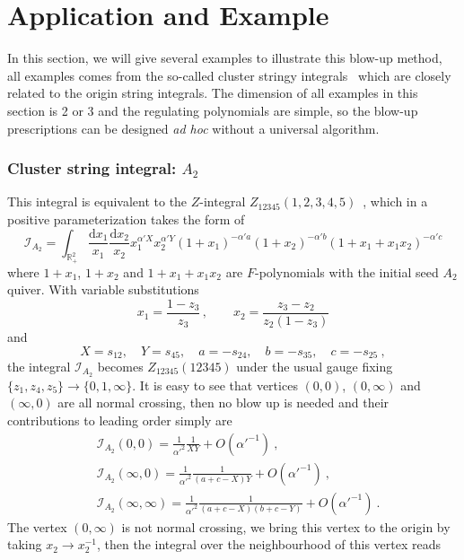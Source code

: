 \documentclass[12pt]{article}
\theoremstyle{definition}
\theoremstyle{plain}
\newcommand{\dif}{\mathrm{d}} %
\begin{document}
\section{Application and Example}

In this section, we will give several examples to illustrate this blow-up method, all examples comes from the so-called cluster stringy integrals~\cite{Arkani-Hamed:2019mrd} which are closely related to the origin string integrals. The dimension of all examples in this section is 2 or 3 and the regulating polynomials are simple, so the blow-up prescriptions can be designed \emph{ad hoc} without a universal algorithm.


\subsubsection*{Cluster string integral: $A_{2}$}
This integral is equivalent to the $Z$-integral $Z_{12345}(1,2,3,4,5)$~\cite{}, which in a positive parameterization takes the form of 
\[
	\mathcal{I}_{A_{2}}=\int_{\mathbb R_+^2} \frac{\dif x_1}{x_1}\frac{\dif x_2}{x_2}x_1^{\alpha' X}x_2^{\alpha' Y}
	(1+x_1)^{-\alpha' a}(1+x_2)^{-\alpha' b}(1+x_1+x_1x_2)^{-\alpha' c}
\] 
where $1+x_{1}$, $1+x_{2}$ and $1+x_{1}+x_{1}x_{2}$ are $F$-polynomials with the initial seed $A_{2}$ quiver. With variable substitutions
\[
	x_{1}=\frac{1-z_{3}}{z_{3}}\,,\qquad x_{2}=\frac{z_{3}-z_{2}}{z_{2}(1-z_{3})}
\]
and 
\[
	X=s_{12},\quad Y=s_{45},\quad a=-s_{24},\quad b=-s_{35},\quad c=-s_{25} \:,
	\] 
the integral $\mathcal{I}_{A_{2}}$ becomes $Z_{12345}(12345)$ under the usual gauge fixing $\{z_{1},z_{4},z_{5}\}\to\{0,1,\infty\}$. It is easy to see that vertices $(0,0)$, $(0,\infty)$ and $(\infty,0)$ are all normal crossing, then no blow up is needed and their contributions to leading order simply are
\begin{align*}
	&\mathcal{I}_{A_{2}}(0,0)=\frac{1}{\alpha'^{2}}\frac{1}{XY}+O(\alpha'^{-1}) \:, \\
	&\mathcal{I}_{A_{2}}(\infty,0)=\frac{1}{\alpha'^{2}}\frac{1}{(a+c-X)Y}+O(\alpha'^{-1}) \:, \\
	&\mathcal{I}_{A_{2}}(\infty,\infty)=\frac{1}{\alpha'^{2}}\frac{1}{(a+c-X)(b+c-Y)}+O(\alpha'^{-1}) \:.
\end{align*}
The vertex $(0,\infty)$ is not normal crossing, we bring this vertex to the origin by taking $x_{2}\to x_{2}^{-1}$, then the integral over the neighbourhood of this vertex reads
\end{document}

